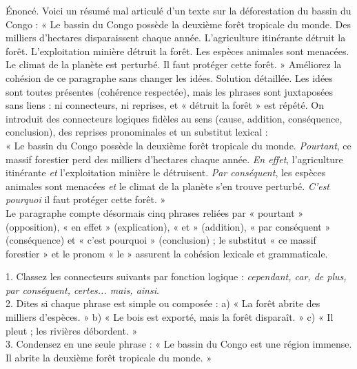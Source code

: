 \documentclass[11pt]{article}
\begin{document}
\begin{exoresolu}
Énoncé. Voici un résumé mal articulé d'un texte sur la déforestation du bassin du Congo : « Le bassin du Congo possède la deuxième forêt tropicale du monde. Des milliers d'hectares disparaissent chaque année. L'agriculture itinérante détruit la forêt. L'exploitation minière détruit la forêt. Les espèces animales sont menacées. Le climat de la planète est perturbé. Il faut protéger cette forêt. » Améliorez la cohésion de ce paragraphe sans changer les idées.
\tcblower
Solution détaillée. Les idées sont toutes présentes (cohérence respectée), mais les phrases sont juxtaposées sans liens : ni connecteurs, ni reprises, et « détruit la forêt » est répété. On introduit des connecteurs logiques fidèles au sens (cause, addition, conséquence, conclusion), des reprises pronominales et un substitut lexical :\\
« Le bassin du Congo possède la deuxième forêt tropicale du monde. \emph{Pourtant}, ce massif forestier perd des milliers d'hectares chaque année. \emph{En effet}, l'agriculture itinérante \emph{et} l'exploitation minière le détruisent. \emph{Par conséquent}, les espèces animales sont menacées \emph{et} le climat de la planète s'en trouve perturbé. \emph{C'est pourquoi} il faut protéger cette forêt. »\\
Le paragraphe compte désormais cinq phrases reliées par « pourtant » (opposition), « en effet » (explication), « et » (addition), « par conséquent » (conséquence) et « c'est pourquoi » (conclusion) ; le substitut « ce massif forestier » et le pronom « le » assurent la cohésion lexicale et grammaticale.
\end{exoresolu}

\begin{exercice}
1. Classez les connecteurs suivants par fonction logique : \emph{cependant, car, de plus, par conséquent, certes... mais, ainsi}.\\
2. Dites si chaque phrase est simple ou composée : a) « La forêt abrite des milliers d'espèces. » b) « Le bois est exporté, mais la forêt disparaît. » c) « Il pleut ; les rivières débordent. »\\
3. Condensez en une seule phrase : « Le bassin du Congo est une région immense. Il abrite la deuxième forêt tropicale du monde. »
\end{exercice}
\end{document}
